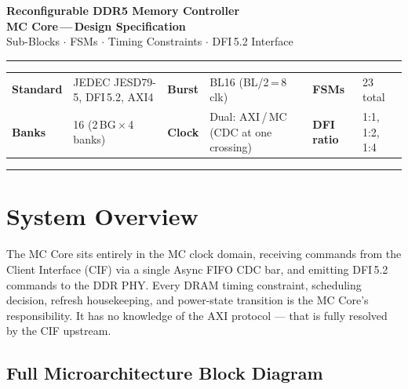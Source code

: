 \documentclass[10pt,a4paper]{article}
\begin{document}

\begin{flushleft}
  {\large\bfseries\color{acc1} Reconfigurable DDR5 Memory Controller}\\[2pt]
  {\normalsize\bfseries MC Core\,---\,Design Specification}\\[3pt]
  {\small\color{notetext}Sub-Blocks $\cdot$ FSMs $\cdot$ Timing Constraints $\cdot$
   DFI\,5.2 Interface}
\end{flushleft}
\noindent\color{acc1}\rule{\linewidth}{0.7pt}
\smallskip
\begin{tabular}{@{}ll@{\quad}ll@{\quad}ll@{}}
\small\textbf{Standard} & \small JEDEC JESD79-5, DFI\,5.2, AXI4 &
\small\textbf{Burst}    & \small BL16 (BL/2\,=\,8\,clk) &
\small\textbf{FSMs}     & \small 23 total \\
\small\textbf{Banks}    & \small 16 (2\,BG\,$\times$\,4 banks) &
\small\textbf{Clock}    & \small Dual: AXI\,/\,MC (CDC at one crossing) &
\small\textbf{DFI ratio}& \small 1:1, 1:2, 1:4 \\
\end{tabular}
\vspace{2pt}\noindent\color{ruleclr}\rule{\linewidth}{0.4pt}

\section{System Overview}

The MC Core sits entirely in the MC clock domain, receiving commands from the Client
Interface (CIF) via a single Async FIFO CDC bar, and emitting DFI\,5.2 commands to the
DDR PHY. Every DRAM timing constraint, scheduling decision, refresh housekeeping, and
power-state transition is the MC Core's responsibility. It has no knowledge of the AXI
protocol --- that is fully resolved by the CIF upstream.

\subsection{Full Microarchitecture Block Diagram}
\end{document}
